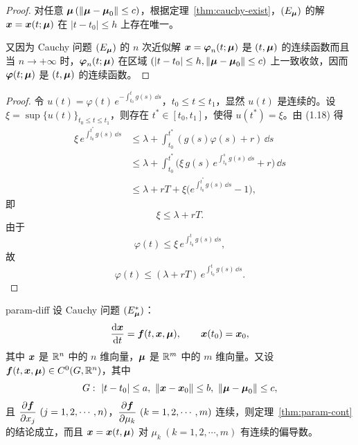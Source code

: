 \begin{proof}
	对任意 $\boldsymbol{\mu}\,(\|\boldsymbol{\mu} - \boldsymbol{\mu}_0\| \leq c)$，根据定理~\ref{thm:cauchy-exist}，$(E_{\boldsymbol{\mu}})$ 的解 $\boldsymbol{x} = \boldsymbol{x}(t; \boldsymbol{\mu})$ 在 $|t - t_0| \leq h$ 上存在唯一。

	又因为 Cauchy 问题 $(E_{\boldsymbol{\mu}})$ 的 $n$ 次近似解 $\boldsymbol{x} = \boldsymbol{\varphi}_n(t; \boldsymbol{\mu})$ 是 $(t, \boldsymbol{\mu})$ 的连续函数而且当 $n \to +\infty$ 时，$\boldsymbol{\varphi}_n(t; \boldsymbol{\mu})$ 在区域 $(|t - t_0| \leq h, \|\boldsymbol{\mu} - \boldsymbol{\mu}_0\| \leq c)$ 上一致收敛，因而 $\boldsymbol{\varphi}(t; \boldsymbol{\mu})$ 是 $(t, \boldsymbol{\mu})$ 的连续函数。
\end{proof}


\begin{proof}
	令 $u(t) = \varphi(t)\,e^{-\int_{t_0}^t g(s)\,\dd s}$，$t_0 \leq t \leq t_1$，显然 $u(t)$ 是连续的。设 $\xi = \sup\{u(t)\}_{t_0 \leq t \leq t_1}$，则存在 $t^* \in [t_0, t_1]$，使得 $u(t^*) = \xi$。由 (1.18) 得
	\begin{align*}
		\xi\,e^{\int_{t_0}^{t^*} g(s)\,\dd s} 
		&\leq \lambda + \int_{t_0}^{t^*} (g(s)\varphi(s) + r)\,\dd s \\
		&\leq \lambda + \int_{t_0}^{t^*} \bigl(\xi\,g(s)\,e^{\int_{t_0}^s g(s)\,\dd s} + r\bigr)\,\dd s \\
		&\leq \lambda + rT + \xi\bigl(e^{\int_{t_0}^{t^*} g(s)\,\dd s} - 1\bigr),
	\end{align*}
	即
	\[
		\xi \leq \lambda + rT.
	\]
	由于
	\[
		\varphi(t) \leq \xi\,e^{\int_{t_0}^t g(s)\,\dd s},
	\]
	故
	\[
		\varphi(t) \leq (\lambda + rT)\,e^{\int_{t_0}^t g(s)\,\dd s}.
	\]
\end{proof}

\begin{theorem}{}{param-diff}
	设 Cauchy 问题 $(E_{\boldsymbol{\mu}}^*)$：
	\[
		\frac{\mathrm{d} \boldsymbol{x}}{\mathrm{d} t} = \boldsymbol{f}(t, \boldsymbol{x}, \boldsymbol{\mu}), \qquad 
		\boldsymbol{x}(t_0) = \boldsymbol{x}_0,
	\]
	其中 $\boldsymbol{x}$ 是 $\mathbb{R}^n$ 中的 $n$ 维向量，$\boldsymbol{\mu}$ 是 $\mathbb{R}^m$ 中的 $m$ 维向量。又设 $\boldsymbol{f}(t, \boldsymbol{x}, \boldsymbol{\mu}) \in C^0(G, \mathbb{R}^n)$，其中
	\[
		G:\ |t - t_0| \leq a,\ \|\boldsymbol{x} - \boldsymbol{x}_0\| \leq b,\ \|\boldsymbol{\mu} - \boldsymbol{\mu}_0\| \leq c,
	\]
	且 $\dfrac{\partial \boldsymbol{f}}{\partial x_j}\ (j = 1, 2, \cdots, n)$，$\dfrac{\partial \boldsymbol{f}}{\partial \mu_k}\ (k = 1, 2, \cdots, m)$ 连续，则定理~\ref{thm:param-cont} 的结论成立，而且 $\boldsymbol{x} = \boldsymbol{x}(t, \boldsymbol{\mu})$ 对 $\mu_k\ (k = 1, 2, \cdots, m)$ 有连续的偏导数。
\end{theorem}

